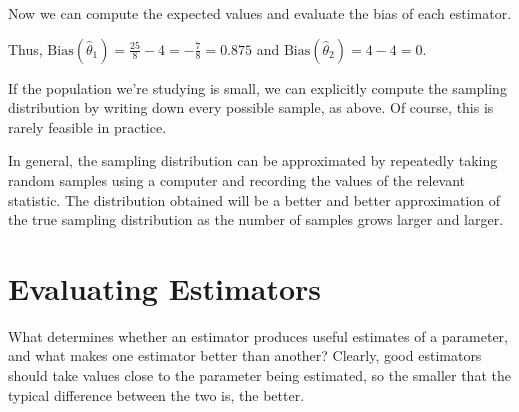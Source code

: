 \begin{examp}
\par
\noindent Now we can compute the expected values and evaluate the bias of each estimator.
\par
\noindent Thus, $\text{Bias}(\widehat{\theta}_1) = \frac{25}{8} - 4 = -\frac{7}{8} = 0.875$ and $\text{Bias}(\widehat{\theta}_2) = 4 - 4 = 0$.

\end{examp}
\par
\rmk If the population we're studying is small, we can explicitly compute the sampling distribution by writing down every possible sample, as above. Of course, this is rarely feasible in practice. 

In general, the sampling distribution can be approximated by repeatedly taking random samples using a computer and recording the values of the relevant statistic. The distribution obtained will be a better and better approximation of the true sampling distribution as the number of samples grows larger and larger.

\section{Evaluating Estimators}

What determines whether an estimator produces useful estimates of a parameter, and what makes one estimator better than another? Clearly, good estimators should take values close to the parameter being estimated, so the smaller that the typical difference between the two is, the better.


